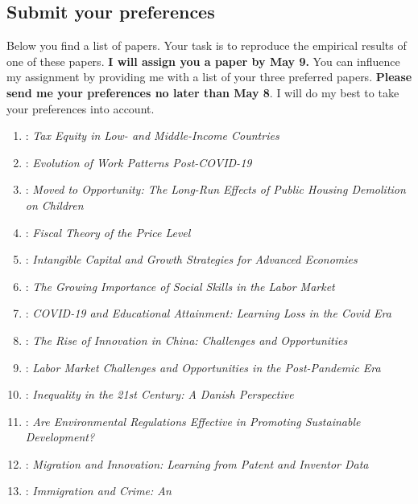 \documentclass[
  a4paper,
  onecolumn,
  oneside]{scrartcl}
\providecommand{\tightlist}{%
  \setlength{\itemsep}{0pt}\setlength{\parskip}{0pt}}\usepackage{longtable,booktabs,array}
\begin{document}
\subsection{Submit your preferences}\label{submit-your-preferences}

Below you find a list of papers. Your task is to reproduce the empirical
results of one of these papers. \textbf{I will assign you a paper by May
9.} You can influence my assignment by providing me with a list of your
three preferred papers. \textbf{Please send me your preferences no later
than May 8}. I will do my best to take your preferences into account.

\begin{enumerate}
\def\labelenumi{\arabic{enumi}.}
\tightlist
\item
  \citet{Bachas2024Tax}: \emph{Tax Equity in Low- and Middle-Income
  Countries}
\item
  \citet{Barrero2023Evolution}: \emph{Evolution of Work Patterns
  Post-COVID-19}
\item
  \citet{Chyn2021Neighborhoods}: \emph{Moved to Opportunity: The
  Long-Run Effects of Public Housing Demolition on Children}
\item
  \citet{Cochrane2022Fiscal}: \emph{Fiscal Theory of the Price Level}
\item
  \citet{Corrado2022Intangible}: \emph{Intangible Capital and Growth
  Strategies for Advanced Economies}
\item
  \citet{Deming2022Four}: \emph{The Growing Importance of Social Skills
  in the Labor Market}
\item
  \citet{Jack2023COVID}: \emph{COVID-19 and Educational Attainment:
  Learning Loss in the Covid Era}
\item
  \citet{Jones2021Rise}: \emph{The Rise of Innovation in China:
  Challenges and Opportunities}
\item
  \citet{Kearney2022Puzzle}: \emph{Labor Market Challenges and
  Opportunities in the Post-Pandemic Era}
\item
  \citet{Kreiner2022Danish}: \emph{Inequality in the 21st Century: A
  Danish Perspective}
\item
  \citet{Levinson2023Are}: \emph{Are Environmental Regulations Effective
  in Promoting Sustainable Development?}
\item
  \citet{Lissoni2024Migration}: \emph{Migration and Innovation: Learning
  from Patent and Inventor Data}
\item
  \citet{Marie2024Immigration}: \emph{Immigration and Crime: An
}
\end{enumerate}
\end{document}
